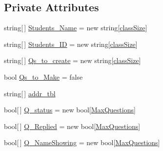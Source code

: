 \subsection*{\-Private \-Attributes}
\begin{DoxyCompactItemize}
\item 
string\mbox{[}$\,$\mbox{]} \hyperlink{class_sr_p___classroom_inq_1_1frm_classrrom_inq_ad595ee0cb55235eda789723fe8967521}{\-Students\-\_\-\-Name} = new string\mbox{[}\hyperlink{class_sr_p___classroom_inq_1_1frm_classrrom_inq_a78d9aab335edfe53d39036b9d89928a8}{class\-Size}\mbox{]}
\item 
string\mbox{[}$\,$\mbox{]} \hyperlink{class_sr_p___classroom_inq_1_1frm_classrrom_inq_a68a93f6247168ebfa500f7afe83cce94}{\-Students\-\_\-\-I\-D} = new string\mbox{[}\hyperlink{class_sr_p___classroom_inq_1_1frm_classrrom_inq_a78d9aab335edfe53d39036b9d89928a8}{class\-Size}\mbox{]}
\item 
string\mbox{[}$\,$\mbox{]} \hyperlink{class_sr_p___classroom_inq_1_1frm_classrrom_inq_a04ea330233515e3af7d23fcd501364cc}{\-Qs\-\_\-to\-\_\-create} = new string\mbox{[}\hyperlink{class_sr_p___classroom_inq_1_1frm_classrrom_inq_a78d9aab335edfe53d39036b9d89928a8}{class\-Size}\mbox{]}
\item 
bool \hyperlink{class_sr_p___classroom_inq_1_1frm_classrrom_inq_a74b0b2afc18cdf1d19dc415ab870e68b}{\-Qs\-\_\-to\-\_\-\-Make} = false
\item 
string\mbox{[}$\,$\mbox{]} \hyperlink{class_sr_p___classroom_inq_1_1frm_classrrom_inq_a0f417902be6534cb30d93b2c0d836165}{addr\-\_\-tbl}
\item 
bool\mbox{[}$\,$\mbox{]} \hyperlink{class_sr_p___classroom_inq_1_1frm_classrrom_inq_ae02a7c8f440963717ee0cf2f74d4d56a}{\-Q\-\_\-status} = new bool\mbox{[}\hyperlink{class_sr_p___classroom_inq_1_1frm_classrrom_inq_abbcb6a4a2ba214bc7aab16386f0e8c98}{\-Max\-Questions}\mbox{]}
\item 
bool\mbox{[}$\,$\mbox{]} \hyperlink{class_sr_p___classroom_inq_1_1frm_classrrom_inq_af7c089d129d15a45c05bede3e9554f58}{\-Q\-\_\-\-Replied} = new bool\mbox{[}\hyperlink{class_sr_p___classroom_inq_1_1frm_classrrom_inq_abbcb6a4a2ba214bc7aab16386f0e8c98}{\-Max\-Questions}\mbox{]}
\item 
bool\mbox{[}$\,$\mbox{]} \hyperlink{class_sr_p___classroom_inq_1_1frm_classrrom_inq_a717931be8f79e53cf69e10515df3115e}{\-Q\-\_\-\-Name\-Showing} = new bool\mbox{[}\hyperlink{class_sr_p___classroom_inq_1_1frm_classrrom_inq_abbcb6a4a2ba214bc7aab16386f0e8c98}{\-Max\-Questions}\mbox{]}
\item 

\end{DoxyCompactItemize}
